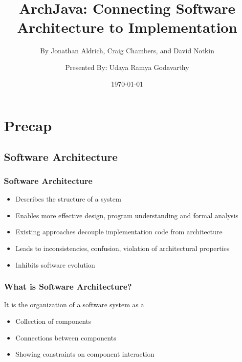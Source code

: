 \documentclass{beamer}
\title[ArchJava]{ArchJava: \newline
Connecting Software Architecture to Implementation}
\subtitle{By Jonathan Aldrich, Craig Chambers, and David Notkin}
\author[Ramya - A05070102]{Presented By: Udaya Ramya Godavarthy}
\institute[TXST]{Texas State University}
\date{\today}
\begin{document}
\frame{\titlepage}

\section[Outline]{}

\section{Precap}
\subsection{Software Architecture}
\frame
{
  \frametitle{Software Architecture}
  \begin{itemize}
  \item Describes the structure of a system 
  \item Enables more effective design, program understanding and formal analysis 
  \item Existing approaches decouple implementation code from architecture 
  \item Leads to inconsistencies, confusion, violation of architectural properties
  \item Inhibits software evolution
  \end{itemize}
}

\frame
{
\frametitle{What is Software Architecture?}
\begin{block}{It is the organization of a software system as a }

  \begin{itemize}
  \item Collection of components \newline
  \item Connections between components \newline
  \item Showing constraints on component interaction \newline
   \end{itemize}
  \end{block}
}
\end{document}
